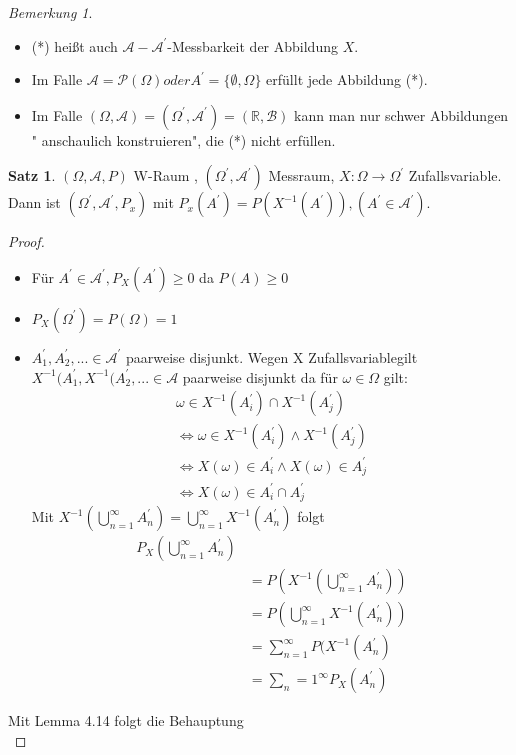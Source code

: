 \documentclass[a4paper,12pt,fleqn]{scrartcl}
\newcommand{\R}{\mathbb{R}}
\newcommand{\m}[1]{\mathcal{ #1 }}
\newcommand{\ZV}{Zufallsvariable}
\theoremstyle{definition}
\newtheorem{satz}[definition]{Satz}
\theoremstyle{plain}
\theoremstyle{remark}
\newtheorem*{bemerkung}{Bemerkung}
\begin{document}
\begin{bemerkung}
\begin{itemize}
\item (*) heißt auch $ \m{A} - \m{A}^\prime$-Messbarkeit der Abbildung $X$.
\item Im Falle $\m{A} = \m{P}( \Omega ) oder A^\prime = \{ \emptyset , \Omega \}$ erfüllt jede Abbildung (*).
\item Im Falle $( \Omega , \m{A}) = ( \Omega^\prime , \m{A}^\prime) = ( \R , \m{B} ) $ kann man nur schwer Abbildungen " anschaulich konstruieren", die (*) nicht erfüllen.
\end{itemize}
\end{bemerkung}
\begin{satz}
$( \Omega , \m{A} , P)$ W-Raum , $(\Omega^\prime, \m{A}^\prime)$ Messraum, $X : \Omega \rightarrow \Omega^\prime$ \ZV. Dann ist $( \Omega^\prime , \m{A}^\prime , P_x) $ mit $ P_x(A^\prime) = P(X^{-1}(A^\prime)), ( A^\prime \in \m{A}^\prime ) $.
\end{satz}
\begin{proof}
\begin{itemize}
\item Für $ A^\prime \in \m{A}^\prime, P_X(A^\prime) \geq 0 $ da $P(A) \geq 0$
\item $P_X(\Omega^\prime ) = P(\Omega) = 1$
\item $A_1^\prime, A_2^\prime, ... \in \m{A}^\prime $ paarweise disjunkt. Wegen X \ZV gilt $X^{-1}(A_1^\prime, X^{-1}(A_2^\prime,... \in \m{A}$ paarweise disjunkt da für $ \omega \in \Omega $ gilt: 
\begin{align*}
\omega \in X^{-1}(A_i^\prime) \cap X^{-1}(A_j^\prime) \\
\Leftrightarrow \omega \in X^{-1}(A_i^\prime) \land X^{-1}(A_j^\prime) \\
\Leftrightarrow X(\omega) \in A_i^\prime \land X(\omega) \in A_j^\prime \\
\Leftrightarrow X(\omega) \in A_i^\prime \cap A_j^\prime
\end{align*} 
Mit $X^{-1}( \bigcup_{n=1}^{ \infty }{A_n^\prime} ) = \bigcup_{n=1}^{ \infty }{X^{-1}(A_n^\prime)}$ folgt
\begin{align*}
P_X(\bigcup_{n=1}^{ \infty }{A_n^\prime}) \\
&= P(X^{-1} ( \bigcup_{n=1}^{ \infty }{A_n^\prime} )) \\
&= P(\bigcup_{n=1}^{ \infty }{X^{-1}(A_n^\prime)}) \\
&= \sum_{n=1}^{\infty}{P(X^{-1}(A_n^\prime)} \\
&= \sum_n=1^\infty {P_X(A_n^\prime)}
\end{align*}
\end{itemize}
Mit Lemma 4.14 folgt die Behauptung \\
\end{proof}
\end{document}
